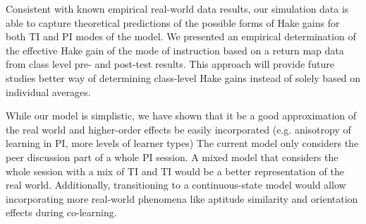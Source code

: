 \documentclass[twocolumn,secnumarabic,amssymb, nobibnotes, aps, prd]{revtex4-2}
\begin{document}
    Consistent with known empirical real-world data results, our simulation data is able to capture theoretical predictions of the possible forms of Hake gains for both TI and PI modes of the model.
    We presented an empirical determination of the effective Hake gain of the mode of instruction based on a return map data from class level pre- and post-test results.
    This approach will provide future studies better way of determining class-level Hake gains instead of solely based on individual averages.

    While our model is simplistic, we have shown that it be a good approximation of the real world and higher-order effects be easily incorporated (e.g. anisotropy of learning in PI, more levels of learner types)
    The current model only considers the peer discussion part of a whole PI session.
    A mixed model that considers the whole session with a mix of TI and TI would be a better representation of the real world.
    Additionally, transitioning to a continuous-state model would allow incorporating more real-world phenomena like aptitude similarity and orientation effects during co-learning.


\end{document}
